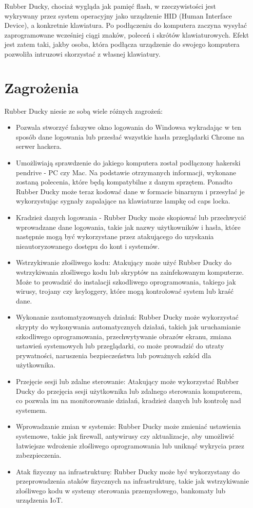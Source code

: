 \documentclass{article}
\begin{document}
Rubber Ducky, chociaż wygląda jak pamięć flash, w rzeczywistości jest wykrywany przez system operacyjny jako urządzenie HID (Human Interface Device), a konkretnie klawiatura. Po podłączeniu do komputera zaczyna wysyłać zaprogramowane wcześniej ciągi znaków, poleceń i skrótów klawiaturowych. Efekt jest zatem taki, jakby osoba, która podłącza urządzenie do swojego komputera pozwoliła intruzowi skorzystać z własnej klawiatury.

\section{Zagrożenia}

Rubber Ducky niesie ze sobą wiele różnych zagrożeń:
\begin{itemize}
    \item Pozwala stworzyć fałszywe okno logowania do Windowsa wykradając w ten sposób dane logowania lub przesłać wszystkie hasła przeglądarki Chrome na serwer hackera. 
    \item Umożliwiają sprawdzenie do jakiego komputera został podłączony hakerski pendrive - PC czy Mac. Na podstawie otrzymanych informacji, wykonane zostaną polecenia, które będą kompatybilne z danym sprzętem. Ponadto Rubber Ducky może teraz kodować dane w formacie binarnym i przesyłać je wykorzystując sygnały zapalające na klawiaturze lampkę od caps locka.
    \item Kradzież danych logowania - Rubber Ducky może skopiować lub przechwycić wprowadzane dane logowania, takie jak nazwy użytkowników i hasła, które następnie mogą być wykorzystane przez atakującego do uzyskania nieautoryzowanego dostępu do kont i systemów.
    \item Wstrzykiwanie złośliwego kodu: Atakujący może użyć Rubber Ducky do wstrzykiwania złośliwego kodu lub skryptów na zainfekowanym komputerze. Może to prowadzić do instalacji szkodliwego oprogramowania, takiego jak wirusy, trojany czy keyloggery, które mogą kontrolować system lub kraść dane.
    \item Wykonanie zautomatyzowanych działań: Rubber Ducky może wykorzystać skrypty do wykonywania automatycznych działań, takich jak uruchamianie szkodliwego oprogramowania, przechwytywanie obrazów ekranu, zmiana ustawień systemowych lub przeglądarki, co może prowadzić do utraty prywatności, naruszenia bezpieczeństwa lub poważnych szkód dla użytkownika.
    \item  Przejęcie sesji lub zdalne sterowanie: Atakujący może wykorzystać Rubber Ducky do przejęcia sesji użytkownika lub zdalnego sterowania komputerem, co pozwala im na monitorowanie działań, kradzież danych lub kontrolę nad systemem.
    \item Wprowadzanie zmian w systemie: Rubber Ducky może zmieniać ustawienia systemowe, takie jak firewall, antywirusy czy aktualizacje, aby umożliwić łatwiejsze wdrożenie złośliwego oprogramowania lub uniknąć wykrycia przez zabezpieczenia.
    \item  Atak fizyczny na infrastrukturę: Rubber Ducky może być wykorzystany do przeprowadzenia ataków fizycznych na infrastrukturę, takie jak wstrzykiwanie złośliwego kodu w systemy sterowania przemysłowego, bankomaty lub urządzenia IoT.


\end{itemize}
\end{document}
